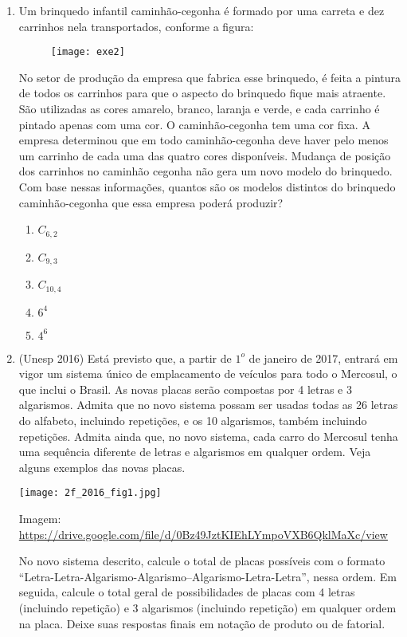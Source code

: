 \begin{enumerate}
\item Um brinquedo infantil caminhão-cegonha é formado por uma carreta e dez carrinhos nela transportados, conforme a figura:

\begin{figure}[H]
\centering

\texttt{[image: exe2]}
\end{figure}

No setor de produção da empresa que fabrica esse brinquedo, é feita a pintura de todos os carrinhos para que o aspecto do brinquedo fique mais atraente. São utilizadas as cores amarelo, branco, laranja e verde, e cada carrinho é pintado apenas com uma cor. O caminhão-cegonha tem uma cor fixa. A empresa determinou que em todo caminhão-cegonha deve haver pelo menos um carrinho de cada uma das quatro cores disponíveis. Mudança de posição dos carrinhos no caminhão cegonha não gera um novo modelo do brinquedo.
Com base nessas informações, quantos são os modelos distintos do brinquedo caminhão-cegonha que essa empresa poderá produzir?
 
 \begin{enumerate}
 
\item $C_{6,2}$
\item $C_{9,3}$
\item $C_{10,4}$
\item $6^4$
\item $4^6$
\end{enumerate}

\item (Unesp 2016) Está previsto que, a partir de $1^{o}$ de janeiro de 2017, entrará em vigor um sistema único de emplacamento de veículos para todo o Mercosul, o que inclui o Brasil. As novas placas serão compostas por 4 letras e 3 algarismos. Admita que no novo sistema possam ser usadas todas as 26 letras do alfabeto, incluindo repetições, e os 10 algarismos, também incluindo repetições. Admita ainda que, no novo sistema, cada carro do Mercosul tenha uma sequência diferente de letras e algarismos em qualquer ordem. Veja alguns exemplos das novas placas.

\begin{center}
\texttt{[image: 2f\_2016\_fig1.jpg]}
\end{center}

Imagem: \url{https://drive.google.com/file/d/0Bz49JztKIEhLYmpoVXB6QklMaXc/view}

No novo sistema descrito, calcule o total de placas possíveis com o formato “Letra-Letra-Algarismo-Algarismo–Algarismo-Letra-Letra”, nessa ordem. Em seguida, calcule o total geral de possibilidades de placas com 4 letras (incluindo repetição) e 3 algarismos (incluindo repetição) em qualquer ordem na placa. Deixe suas respostas finais em notação de produto ou de fatorial.


\end{enumerate}
